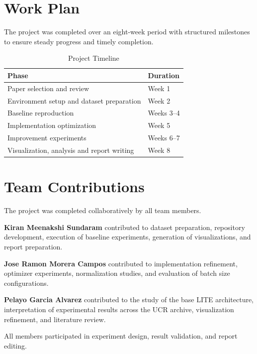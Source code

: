 \documentclass[conference]{IEEEtran}
\begin{document}
\section*{Work Plan}

The project was completed over an eight-week period with structured milestones to ensure steady progress and timely completion.

\begin{table}[H]
    \centering
    \caption{Project Timeline}
    \begin{tabular}{ll}
        \toprule
        Phase                                      & Duration   \\
        \midrule
        Paper selection and review                 & Week 1     \\
        Environment setup and dataset preparation  & Week 2     \\
        Baseline reproduction                      & Weeks 3--4 \\
        Implementation optimization                & Week 5     \\
        Improvement experiments                    & Weeks 6--7 \\
        Visualization, analysis and report writing & Week 8     \\
        \bottomrule
    \end{tabular}
\end{table}



\section*{Team Contributions}

The project was completed collaboratively by all team members.

\textbf{Kiran Meenakshi Sundaram} contributed to dataset preparation, repository development, execution of baseline experiments, generation of visualizations, and report preparation.

\textbf{Jose Ramon Morera Campos} contributed to implementation refinement, optimizer experiments, normalization studies, and evaluation of batch size configurations.

\textbf{Pelayo Garcia Alvarez} contributed to the study of the base LITE architecture, interpretation of experimental results across the UCR archive, visualization refinement, and literature review.

All members participated in experiment design, result validation, and report editing.
\end{document}
